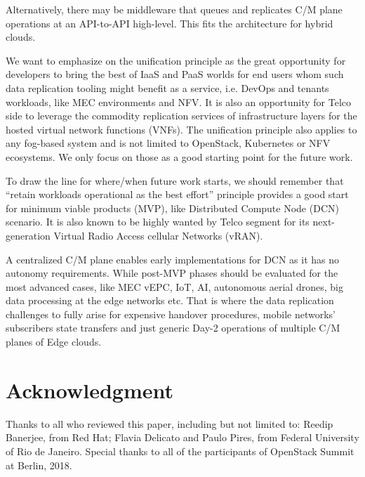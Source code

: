 \documentclass[conference]{IEEEtran}
\begin{document}
Alternatively, there may be middleware that queues and replicates C/M plane
operations at an API-to-API high-level. This fits the architecture for hybrid
clouds.

We want to emphasize on the unification principle as the great opportunity for
developers to bring the best of IaaS and PaaS worlds for end users whom such
data replication tooling might benefit as a service, i.e. DevOps and tenants
workloads, like MEC environments and NFV. It is also an opportunity for Telco
side to leverage the commodity replication services of infrastructure layers
for the hosted virtual network functions (VNFs). The unification principle also
applies to any fog-based system and is not limited to OpenStack, Kubernetes or
NFV ecosystems. We only focus on those as a good starting point for the future
work.

To draw the line for where/when future work starts, we should remember
that ``retain workloads operational as the best effort'' principle provides a
good start for minimum viable products (MVP), like Distributed Compute Node
(DCN) scenario. It is also known to be highly wanted by Telco segment for its
next-generation Virtual Radio Access cellular Networks (vRAN).

A centralized C/M plane enables early implementations for DCN as it has no
autonomy requirements. While post-MVP phases should be evaluated for the most
advanced cases, like MEC vEPC, IoT, AI, autonomous aerial drones, big data
processing at the edge networks etc. That is where the data replication
challenges to fully arise for expensive handover procedures, mobile networks'
subscribers state transfers and just generic Day-2 operations of multiple
C/M planes of Edge clouds.

\section*{Acknowledgment}
Thanks to all who reviewed this paper, including but not limited to:
Reedip Banerjee, from Red Hat; Flavia Delicato and Paulo Pires, from Federal
University of Rio de Janeiro. Special thanks to all of the participants of
OpenStack Summit at Berlin, 2018.
\end{document}
